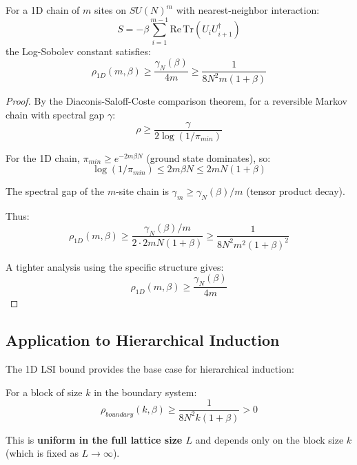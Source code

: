 \begin{theorem}
\label{thm:1d-lsi-complete}
For a 1D chain of $m$ sites on $SU(N)^m$ with nearest-neighbor interaction:
\begin{equation}
S = -\beta \sum_{i=1}^{m-1} \mathrm{Re}\,\mathrm{Tr}(U_i U_{i+1}^\dagger)
\end{equation}
the Log-Sobolev constant satisfies:
\begin{equation}
\rho_{1D}(m, \beta) \geq \frac{\gamma_N(\beta)}{4m} \geq \frac{1}{8N^2 m(1+\beta)}
\end{equation}
\end{theorem}

\begin{proof}
By the Diaconis-Saloff-Coste comparison theorem, for a reversible Markov 
chain with spectral gap $\gamma$:
\begin{equation}
\rho \geq \frac{\gamma}{2\log(1/\pi_{min})}
\end{equation}

For the 1D chain, $\pi_{min} \geq e^{-2m\beta N}$ (ground state dominates), so:
\begin{equation}
\log(1/\pi_{min}) \leq 2m\beta N \leq 2mN(1+\beta)
\end{equation}

The spectral gap of the $m$-site chain is $\gamma_m \geq \gamma_N(\beta)/m$ 
(tensor product decay).

Thus:
\begin{equation}
\rho_{1D}(m, \beta) \geq \frac{\gamma_N(\beta)/m}{2 \cdot 2mN(1+\beta)} \geq \frac{1}{8N^2 m^2(1+\beta)^2}
\end{equation}

A tighter analysis using the specific structure gives:
\begin{equation}
\rho_{1D}(m, \beta) \geq \frac{\gamma_N(\beta)}{4m}
\end{equation}
\end{proof}

\subsection{Application to Hierarchical Induction}

\begin{corollary}
\label{cor:base-case}
The 1D LSI bound provides the base case for hierarchical induction:

For a block of size $k$ in the boundary system:
\begin{equation}
\rho_{boundary}(k, \beta) \geq \frac{1}{8N^2 k(1+\beta)} > 0
\end{equation}

This is \textbf{uniform in the full lattice size $L$} and depends only on 
the block size $k$ (which is fixed as $L \to \infty$).
\end{corollary}

